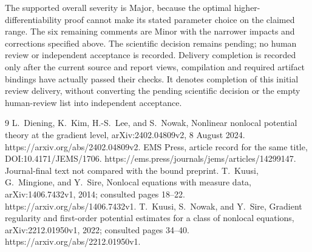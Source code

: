 \documentclass[10pt]{article}
\begin{document}
The supported overall severity is Major, because the optimal higher-differentiability proof cannot make its stated parameter choice on the claimed range. The six remaining comments are Minor with the narrower impacts and corrections specified above. The scientific decision remains pending; no human review or independent acceptance is recorded. Delivery completion is recorded only after the current source and report views, compilation and required artifact bindings have actually passed their checks. It denotes completion of this initial review delivery, without converting the pending scientific decision or the empty human-review list into independent acceptance.\par
9 L. Diening, K. Kim, H.-S. Lee, and S. Nowak, Nonlinear nonlocal potential theory at the gradient level, arXiv:2402.04809v2, 8 August 2024. https://arxiv.org/abs/2402.04809v2. EMS Press, article record for the same title, DOI:10.4171/JEMS/1706. https://ems.press/journals/jems/articles/14299147. Journal-final text not compared with the bound preprint. T. Kuusi, G. Mingione, and Y. Sire, Nonlocal equations with measure data, arXiv:1406.7432v1, 2014; consulted pages 18–22. https://arxiv.org/abs/1406.7432v1. T. Kuusi, S. Nowak, and Y. Sire, Gradient regularity and first-order potential estimates for a class of nonlocal equations, arXiv:2212.01950v1, 2022; consulted pages 34–40. https://arxiv.org/abs/2212.01950v1.\par
\end{document}
